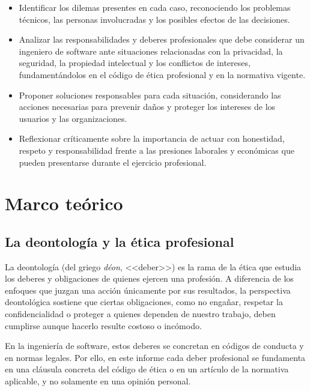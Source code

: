 \documentclass[12pt,a4paper,oneside]{article}
\begin{document}
\begin{itemize}[leftmargin=1.8em,itemsep=3pt,label=\textbullet]
    \item Identificar los dilemas presentes en cada caso, reconociendo los problemas técnicos, las personas involucradas y los posibles efectos de las decisiones.

    \item Analizar las responsabilidades y deberes profesionales que debe considerar un ingeniero de software ante situaciones relacionadas con la privacidad, la seguridad, la propiedad intelectual y los conflictos de intereses, fundamentándolos en el código de ética profesional y en la normativa vigente.

    \item Proponer soluciones responsables para cada situación, considerando las acciones necesarias para prevenir daños y proteger los intereses de los usuarios y las organizaciones.

    \item Reflexionar críticamente sobre la importancia de actuar con honestidad, respeto y responsabilidad frente a las presiones laborales y económicas que pueden presentarse durante el ejercicio profesional.
\end{itemize}

\section{Marco teórico}

\subsection{La deontología y la ética profesional}

La deontología (del griego \emph{déon}, <<deber>>) es la rama de la ética que estudia los deberes y obligaciones de quienes ejercen una profesión. A diferencia de los enfoques que juzgan una acción únicamente por sus resultados, la perspectiva deontológica sostiene que ciertas obligaciones, como no engañar, respetar la confidencialidad o proteger a quienes dependen de nuestro trabajo, deben cumplirse aunque hacerlo resulte costoso o incómodo.

En la ingeniería de software, estos deberes se concretan en códigos de conducta y en normas legales. Por ello, en este informe cada deber profesional se fundamenta en una cláusula concreta del código de ética o en un artículo de la normativa aplicable, y no solamente en una opinión personal.
\end{document}
